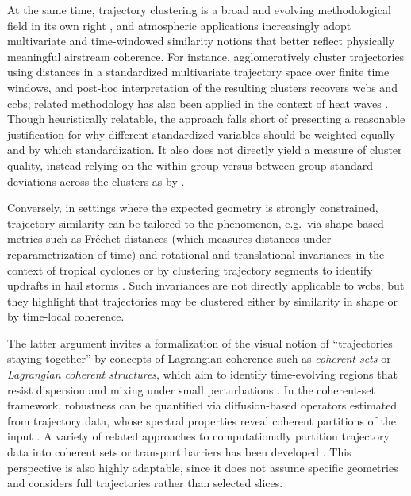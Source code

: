 At the same time, trajectory clustering is a broad and evolving methodological
field in its own right \parencite{yuanReviewMovingObject2017,
    graserMobilityDLReviewDeep2025}, and atmospheric applications increasingly
adopt multivariate and time-windowed similarity notions that better reflect
physically meaningful airstream coherence. For instance,
\textcite{hartDetectionCoherentAirstreams2015} agglomeratively cluster
trajectories using distances in a standardized multivariate trajectory space
over finite time windows, and post-hoc interpretation of the resulting
clusters recovers \glspl{wcb} and \glspl{ccb}; related
methodology has also been applied in the context of heat waves
\parencite{spensbergerDynamicsConcurrentSequential2020}. Though heuristically
relatable, the approach falls short of presenting a reasonable justification
for why different standardized variables should be weighted equally and by
which standardization. It also does not directly yield a measure of cluster
quality, instead relying on the within-group versus between-group standard
deviations across the clusters as by
\textcite{wernliLagrangianbasedAnalysisExtratropical1997}.

Conversely, in settings where the expected geometry is strongly constrained,
trajectory similarity can be tailored to the phenomenon, e.g.~via shape-based
metrics such as Fr\'echet distances (which measures distances under
reparametrization of time) and rotational and translational invariances in the
context of tropical cyclones \parencite{kremerClusterAnalysisTailored2020} or
by clustering trajectory segments to identify updrafts in hail storms
\parencite{adams-selinThreedimensionalHailTrajectory2023}. Such invariances are
not directly applicable to \glspl{wcb}, but they highlight that trajectories
may be clustered either by similarity in shape or by time-local coherence.

The latter argument invites a formalization of the visual notion of
\enquote{trajectories staying together} by concepts of Lagrangian coherence
such as \emph{coherent sets} or \emph{Lagrangian coherent structures}, which
aim to identify time-evolving regions that resist dispersion and mixing under
small perturbations \parencite{hallerCoherentLagrangianVortices2013,
    hallerLagrangianCoherentStructures2015}. In the coherent-set framework,
robustness can be quantified via diffusion-based operators estimated from
trajectory data, whose spectral properties reveal coherent partitions of the
input \parencite{banischUnderstandingGeometryTransport2017,
    froylandAnalyticFrameworkIdentifying2013,
    froylandDynamicIsoperimetryGeometry2015}. A variety of related approaches
to
computationally partition trajectory data into coherent sets or transport
barriers has been developed
\parencite{froylandRoughandreadyClusterbasedApproach2015,
    allshouseLagrangianBasedMethods2015,
    hadjighasemSpectralclusteringApproachLagrangian2016,
    schlueter-kuckCoherentStructureColouring2017,
    padberg-gehleNetworkbasedStudyLagrangian2017,
    koltaiLargeDeviationsSemidistances2018,mowlaviDetectingLagrangianCoherent2022}.
This perspective is also highly adaptable, since it does not assume specific
geometries and considers full trajectories rather than selected slices.

